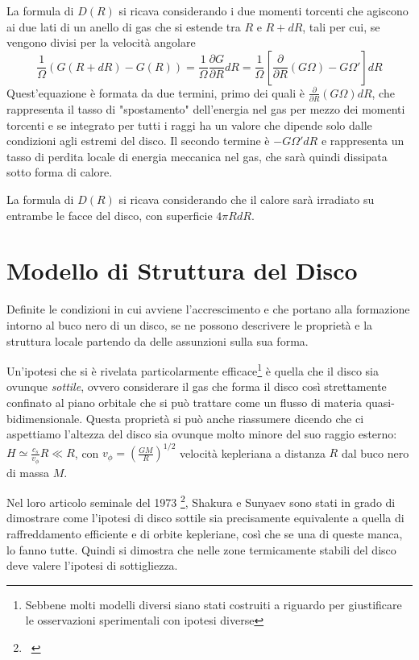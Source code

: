 \documentclass[a4paperbi]{article}
\begin{document}
	La formula di $D(R)$ si ricava considerando i due momenti torcenti che agiscono ai due lati di un anello di gas che si estende tra $R$ e $R+dR$, tali per cui, se vengono divisi per la velocità angolare
	\begin{equation}
		\frac{1}{\Omega}(G(R+dR)-G(R))=\frac{1}{\Omega}\frac{\partial G}{\partial R}dR=\frac{1}{\Omega}\left[\frac{\partial}{\partial R}(G\Omega)-G\Omega'\right]dR
	\end{equation}
	Quest'equazione è formata da due termini, primo dei quali è $\frac{\partial}{\partial R}(G\Omega)dR$, che rappresenta il tasso di "spostamento" dell'energia nel gas per mezzo dei momenti torcenti e se integrato per tutti i raggi ha un valore che dipende solo dalle condizioni agli estremi del disco. Il secondo termine è $-G\Omega'dR$ e rappresenta un tasso di perdita locale di energia meccanica nel gas, che sarà quindi dissipata sotto forma di calore.
	
	La formula di $D(R)$ si ricava considerando che il calore sarà irradiato su entrambe le facce del disco, con superficie $4\pi RdR$.

\newpage
\section{Modello di Struttura del Disco}
	Definite le condizioni in cui avviene l'accrescimento e che portano alla formazione intorno al buco nero di un disco, se ne possono descrivere le proprietà e la struttura locale partendo da delle assunzioni sulla sua forma. 

	Un'ipotesi che si è rivelata particolarmente efficace\footnote{Sebbene molti modelli diversi siano stati costruiti a riguardo per giustificare le osservazioni sperimentali con ipotesi diverse} è quella che il disco sia ovunque \textit{sottile}, ovvero considerare il gas che forma il disco così strettamente confinato al piano orbitale che si può trattare come un flusso di materia quasi-bidimensionale. Questa proprietà si può anche riassumere dicendo che ci aspettiamo l'altezza del disco sia ovunque molto minore del suo raggio esterno: $H\simeq\frac{c_s}{v_\phi}R\ll R$, con $v_\phi=\left(\frac{GM}{R}\right)^{1/2}$ velocità kepleriana a distanza $R$ dal buco nero di massa $M$.
	
	Nel loro articolo seminale del 1973 \footnote{~\cite{ShakuraSunyaev1973}}, Shakura e Sunyaev sono stati in grado di dimostrare come l'ipotesi di disco sottile sia precisamente equivalente a quella di raffreddamento efficiente e di orbite kepleriane, così che se una di queste manca, lo fanno tutte. Quindi si dimostra che nelle zone termicamente stabili del disco deve valere l'ipotesi di sottigliezza.
	
\end{document}
